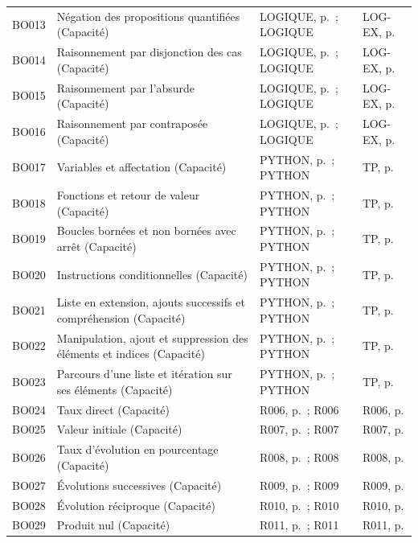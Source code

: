 \begin{longtable}{p{.1\linewidth}p{.43\linewidth}p{.19\linewidth}p{.16\linewidth}}
BO013 & Négation des propositions quantifiées (Capacité) & LOGIQUE, p.\,\pageref{LOGIQUE} ; LOGIQUE & LOG-EX, p.\,\pageref{LOG-EX} \\
BO014 & Raisonnement par disjonction des cas (Capacité) & LOGIQUE, p.\,\pageref{LOGIQUE} ; LOGIQUE & LOG-EX, p.\,\pageref{LOG-EX} \\
BO015 & Raisonnement par l’absurde (Capacité) & LOGIQUE, p.\,\pageref{LOGIQUE} ; LOGIQUE & LOG-EX, p.\,\pageref{LOG-EX} \\
BO016 & Raisonnement par contraposée (Capacité) & LOGIQUE, p.\,\pageref{LOGIQUE} ; LOGIQUE & LOG-EX, p.\,\pageref{LOG-EX} \\
BO017 & Variables et affectation (Capacité) & PYTHON, p.\,\pageref{PYTHON} ; PYTHON & TP, p.\,\pageref{TP} \\
BO018 & Fonctions et retour de valeur (Capacité) & PYTHON, p.\,\pageref{PYTHON} ; PYTHON & TP, p.\,\pageref{TP} \\
BO019 & Boucles bornées et non bornées avec arrêt (Capacité) & PYTHON, p.\,\pageref{PYTHON} ; PYTHON & TP, p.\,\pageref{TP} \\
BO020 & Instructions conditionnelles (Capacité) & PYTHON, p.\,\pageref{PYTHON} ; PYTHON & TP, p.\,\pageref{TP} \\
BO021 & Liste en extension, ajouts successifs et compréhension (Capacité) & PYTHON, p.\,\pageref{PYTHON} ; PYTHON & TP, p.\,\pageref{TP} \\
BO022 & Manipulation, ajout et suppression des éléments et indices (Capacité) & PYTHON, p.\,\pageref{PYTHON} ; PYTHON & TP, p.\,\pageref{TP} \\
BO023 & Parcours d’une liste et itération sur ses éléments (Capacité) & PYTHON, p.\,\pageref{PYTHON} ; PYTHON & TP, p.\,\pageref{TP} \\
BO024 & Taux direct (Capacité) & R006, p.\,\pageref{R006} ; R006 & R006, p.\,\pageref{R006} \\
BO025 & Valeur initiale (Capacité) & R007, p.\,\pageref{R007} ; R007 & R007, p.\,\pageref{R007} \\
BO026 & Taux d’évolution en pourcentage (Capacité) & R008, p.\,\pageref{R008} ; R008 & R008, p.\,\pageref{R008} \\
BO027 & Évolutions successives (Capacité) & R009, p.\,\pageref{R009} ; R009 & R009, p.\,\pageref{R009} \\
BO028 & Évolution réciproque (Capacité) & R010, p.\,\pageref{R010} ; R010 & R010, p.\,\pageref{R010} \\
BO029 & Produit nul (Capacité) & R011, p.\,\pageref{R011} ; R011 & R011, p.\,\pageref{R011} \\

\end{longtable}
